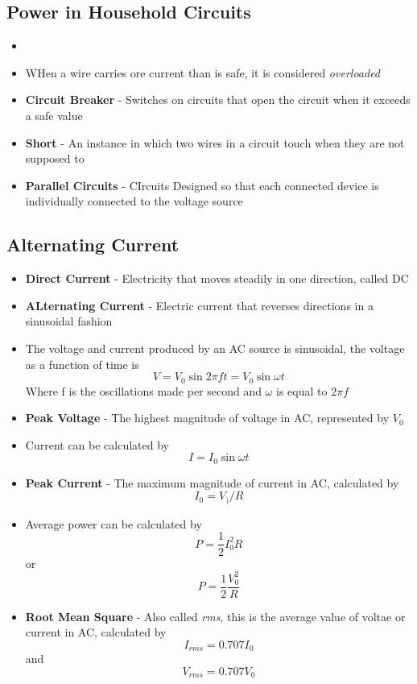 \subsection{Power in Household Circuits}
\begin{itemize}
    \item \item WHen a wire carries ore current than is safe, it is considered \emph{overloaded} 
    \item \textbf{Circuit Breaker} - Switches on circuits that open the circuit when it exceeds a safe value
    \item \textbf{Short} - An instance in which two wires in a circuit touch when they are not supposed to
    \item \textbf{Parallel Circuits} - CIrcuits Designed so that each connected device is individually connected to the voltage source
\end{itemize}

\subsection{Alternating Current}
\begin{itemize}
    \item \textbf{Direct Current} - Electricity that moves steadily in one direction, called DC
    \item \textbf{ALternating Current} - Electric current that reverses directions in a sinusoidal fashion
    \item The voltage and current produced by an AC source is sinusoidal, the voltage as a function of time is \[V=V_0\sin 2\pi ft=V_0\sin\omega t\] Where f is the oscillations made per second and \(\omega\) is equal to \(2\pi f\)
    \item \textbf{Peak Voltage} - The highest magnitude of voltage in AC, represented by \(V_0\)
    \item Current can be calculated by \[I=I_0\sin\omega t\]
    \item \textbf{Peak Current} - The maximum magnitude of current in AC, calculated by \[I_0=V_)/R\]
    \item Average power can be calculated by \[P=\frac{1}{2}I_0^2R\] or \[P=\frac{1}{2}\frac{V_0^2}{R}\]
    \item \textbf{Root Mean Square} - Also called \emph{rms}, this is the average value of voltae or current in AC, calculated by \[I_{rms}=0.707I_0\] and \[V_{rms}=0.707V_0\]
\end{itemize}

